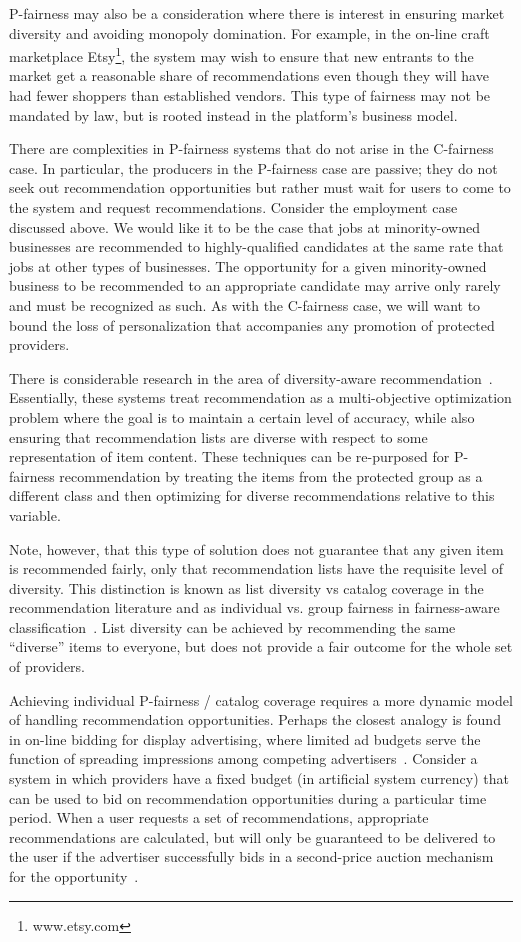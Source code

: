 P-fairness may also be a consideration where there is interest in ensuring market diversity and avoiding monopoly domination. For example, in the on-line craft marketplace Etsy\footnote{www.etsy.com}, the system may wish to ensure that new entrants to the market get a reasonable share of recommendations even though they will have had fewer shoppers than established vendors. This type of fairness may not be mandated by law, but is rooted instead in the platform's business model.

There are complexities in P-fairness systems that do not arise in the C-fairness case. In particular, the producers in the P-fairness case are passive; they do not seek out recommendation opportunities but rather must wait for users to come to the system and request recommendations. Consider the employment case discussed above. We would like it to be the case that jobs at minority-owned businesses are recommended to highly-qualified candidates at the same rate that jobs at other types of businesses. The opportunity for a given minority-owned business to be recommended to an appropriate candidate may arrive only rarely and must be recognized as such. As with the C-fairness case, we will want to bound the loss of personalization that accompanies any promotion of protected providers. 

There is considerable research in the area of diversity-aware recommendation~\cite{Vargas:2011:RRN:2043932.2043955,adomavicius2012improving}. Essentially, these systems treat recommendation as a multi-objective optimization problem where the goal is to maintain a certain level of accuracy, while also ensuring that recommendation lists are diverse with respect to some representation of item content. These techniques can be re-purposed for P-fairness recommendation by treating the items from the protected group as a different class and then optimizing for diverse recommendations relative to this variable.

Note, however, that this type of solution does not guarantee that any given item is recommended fairly, only that recommendation lists have the requisite level of diversity. This distinction is known as list diversity vs catalog coverage in the recommendation literature and as individual vs. group fairness in fairness-aware classification~\cite{fairness}. List diversity can be achieved by recommending the same ``diverse'' items to everyone, but does not provide a fair outcome for the whole set of providers.

Achieving individual P-fairness / catalog coverage requires a more dynamic model of handling recommendation opportunities. Perhaps the closest analogy is found in on-line bidding for display advertising, where limited ad budgets serve the function of spreading impressions among competing advertisers~\cite{internetadvertisingyuan}. Consider a system in which providers have a fixed budget (in artificial system currency) that can be used to bid on recommendation opportunities during a particular time period. When a user requests a set of recommendations, appropriate recommendations are calculated, but will only be guaranteed to be delivered to the user if the advertiser successfully bids in a second-price auction mechanism for the opportunity~\cite{edelman2007internet}.

